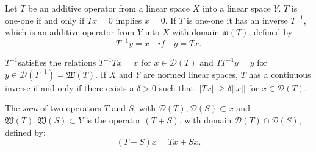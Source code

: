 Let $T$ be an additive operator from a linear space $X$ into a linear
space $Y$. $T$ is one-one if and only if $Tx = 0$ implies $x =0 $. If
$T$ is one-one it has an inverse $T^{-1}$, which is an additive
operator from $Y$ into $X$ with domain $\mathfrak{w}(T)$, defined by 
$$
T^{-1} y = x \quad if \quad y =Tx. 
$$

$T^{-1}$\pageoriginale satisfies the relations $T^{-1}Tx = x$ for $x \in \mathscr{D}
(T)$ and $T T^{-1} y = y$ for $y \in \mathscr{D}(T^{-1}) =
\mathfrak{W}(T)$. If $X$ and $Y$ are normed linear spaces, $T$ has a
continuous inverse if and only if there exists a $\delta > 0$ such
that $|| T x || \ge \delta || x || $ for $x \in \mathscr{D}(T)$. 

The \textit{sum} of two operators $T$ and $S$, with $\mathscr{D}(T),
\mathscr{D}(S) \subset x$ and $\mathfrak{W}(T), \mathfrak{W}(S)
\subset Y$ is the operator $(T + S)$, with domain $\mathscr{D}(T) \cap
\mathscr{D}(S)$, defined by: 
$$
(T + S)x = Tx + Sx. 
$$

